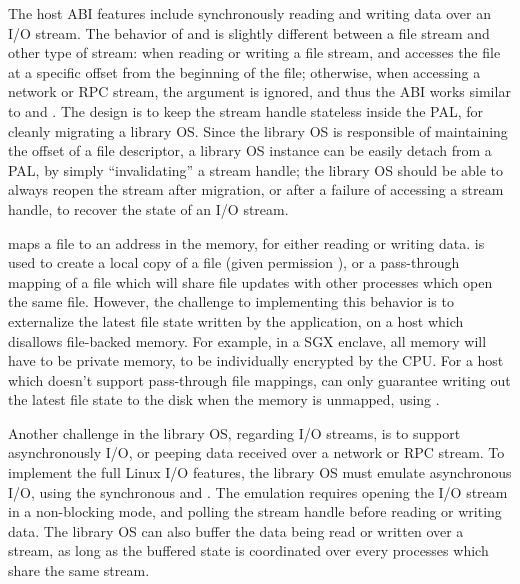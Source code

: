 The host ABI features include synchronously reading and writing data over an I/O stream.
The behavior of  and  is slightly different between a file stream and other type of stream:
when reading or writing a file stream,  and  accesses the file at a specific offset from the beginning of the file;
otherwise, when accessing a network or RPC stream,
the argument  is ignored, and thus the ABI works similar to  and .
The design is to keep the stream handle stateless inside the PAL,
for cleanly migrating a library OS.
Since the library OS is responsible of maintaining the offset of a file descriptor,
a library OS instance can be easily detach from a PAL,
by simply ``invalidating'' a stream handle;
the library OS should be able to always reopen the stream after migration,
or after a failure of accessing a stream handle,
to recover the state of an I/O stream.



 maps a file to an address in the memory,
for either reading or writing data.
 is used to create a local copy of a file (given permission ),
or a pass-through mapping of a file
which will share file updates with other processes which open the same file.
However, the challenge to implementing this behavior
is to externalize the latest file state
written by the application,
on a host which disallows file-backed memory.
For example, in a SGX enclave, all memory will have to be private memory,
to be individually encrypted by the CPU.
For a host which doesn't support pass-through file mappings,
can only guarantee writing out
the latest file state to the disk when the memory is unmapped, using .



Another challenge in the library OS, regarding I/O streams,
is to support asynchronously I/O, or peeping data received over a network or RPC stream.
To implement the full Linux I/O features,
the library OS must emulate asynchronous I/O,
using the synchronous
 and .
The emulation requires opening the I/O stream in a non-blocking mode,
and polling the stream handle before reading or writing data.
The library OS can also buffer the data being read or written over a stream,
as long as the buffered state is coordinated over every processes
which share the same stream.



